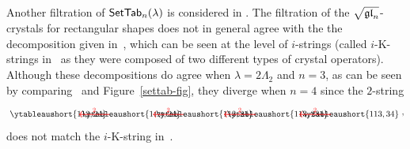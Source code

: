 \documentclass[11pt]{article}
\begin{document}
\begin{example}
\label{ex:PS_nondem}
Another filtration of $\mathsf{SetTab}_n(\lambda)$ is considered in \cite{PS22}. 
The filtration of the $\sqrt{\mathfrak{gl}_n}$-crystals for rectangular shapes does not in general agree with the the decomposition given in~\cite{PS22}, which can be seen at the level of $i$-strings (called $i$-K-strings in~\cite{PS22} as they were composed of two different types of crystal operators).
Although these decompositions do agree when  $\lambda = 2\Lambda_2$ and $n = 3$, as can be seen by comparing~\cite[Fig.~2]{PS22} and Figure~\ref{settab-fig},  they diverge when $n = 4$ since the $2$-string
\[
\begin{tikzpicture}[xscale=1.5,baseline=0]
\node (1) at (0,0) {$\ytableaushort{{1}{12},{2}{4}}$};
\node (2) at (2,0) {$\ytableaushort{{1}{\scalebox{.8}{123}},{2}{4}}$};
\node (3) at (4,0) {$\ytableaushort{{1}{13},{2}{4}}$};
\node (4) at (6,0) {$\ytableaushort{{1}{13},{23}{4}}$};
\node (5) at (8,0) {$\ytableaushort{{1}{13},{3}{4}}$};
\draw[->,thick,red] (1) -- node[midway,scale=0.75,above] {$2$} (2);
\draw[->,thick,red] (2) -- node[midway,scale=0.75,above] {$2$} (3);
\draw[->,thick,red] (3) -- node[midway,scale=0.75,above] {$2$} (4);
\draw[->,thick,red] (4) -- node[midway,scale=0.75,above] {$2$} (5);
\end{tikzpicture},
\]
does not match the $i$-K-string in~\cite{PS22}.
\end{example}
 
\end{document}
